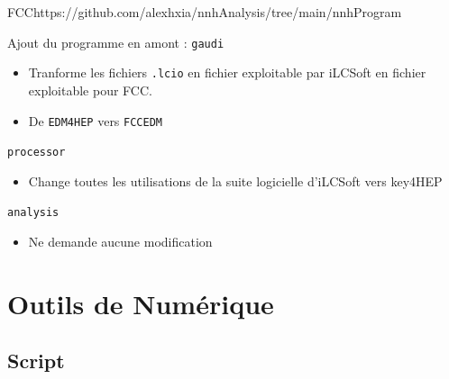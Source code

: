 \documentclass[9pt]{beamer}
\begin{document}
\begin{frame}{FCC}{https://github.com/alexhxia/nnhAnalysis/tree/main/nnhProgram}

	\begin{block}{Ajout du programme en amont : \texttt{gaudi}}
		\begin{itemize}
			\item Tranforme les fichiers \texttt{.lcio} en fichier exploitable par iLCSoft en fichier exploitable pour FCC.
			\item De \texttt{EDM4HEP} vers \texttt{FCCEDM}
		\end{itemize}
	\end{block}

	\begin{block}{\texttt{processor}}
		\begin{itemize}
			\item Change toutes les utilisations de la suite logicielle d'iLCSoft vers key4HEP
		\end{itemize}
	\end{block}

	\begin{block}{\texttt{analysis}}
		\begin{itemize}
			\item Ne demande aucune modification
		\end{itemize}
	\end{block}

\end{frame}

\section{Outils de Numérique}

\subsection{Script}
\end{document}
